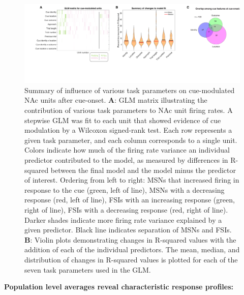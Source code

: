 \documentclass[11pt]{article}
\newcommand{\bsf}[1]{\textbf{#1}}
\begin{document}
{\begin{figure}[h]
\centering
\includegraphics[width=\textwidth]{Fig 6 - GLM.png}
\caption{Summary of influence of various task parameters on cue-modulated NAc
  units after cue-onset. \bsf{A}: GLM matrix illustrating the contribution of
  various task parameters to NAc unit firing rates. A stepwise GLM was fit to
  each unit that showed evidence of cue modulation by a Wilcoxon signed-rank
  test. Each row represents a given task parameter, and each column corresponds
  to a single unit. Colors indicate how much of the firing rate variance an
  individual predictor contributed to the model, as measured by differences in
  R-squared between the final model and the model minus the predictor of
  interest. Ordering from left to right: MSNs that increased firing in response
  to the cue (green, left of line), MSNs with a decreasing response (red, left
  of line), FSIs with an increasing response (green, right of line), FSIs with a
  decreasing response (red, right of line). Darker shades indicate more firing
  rate variance explained by a given predictor. Black line indicates separation
  of MSNs and FSIs. \bsf{B}: Violin plots demonstrating changes in R-squared
  values with the addition of each of the individual predictors. The mean,
  median, and distribution of changes in R-squared values is plotted for each of
  the seven task parameters used in the GLM.}
\label{fig:GLM}
\end{figure}

{\bf Population level averages reveal characteristic response profiles:}

}
\end{document}
